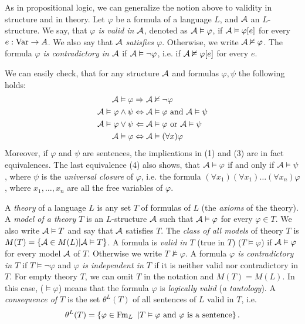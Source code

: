 As in propositional logic, we can generalize the notion above to validity in structure and in theory. Let $\varphi$ be a formula of a language $L$, and $\mathcal{A}$ an $L$-structure. We say, that \emph{$\varphi$ is valid in $\mathcal{A}$}, denoted as $\mathcal{A} \vDash \varphi$, if $\mathcal{A} \vDash \varphi[e]$ for every $e: \operatorname{Var} \to A$. We also say that \emph{$\mathcal{A}$ satisfies $\varphi$}. Otherwise, we write $\mathcal{A} \nvDash \varphi$. The formula \emph{$\varphi$ is contradictory in $\mathcal{A}$} if $\mathcal{A} \vDash \neg \varphi$, i.e. if $\mathcal{A} \nvDash \varphi[e]$ for every $e$.

We can easily check, that for any structure $\mathcal{A}$ and formulas $\varphi, \psi$ the following holds:
\begin{align}
	\mathcal{A} \vDash \varphi & \Rightarrow \mathcal{A} \nvDash \neg \varphi \\
	\mathcal{A} \vDash \varphi \land \psi & \Leftrightarrow \mathcal{A} \vDash \varphi \text{ and } \mathcal{A} \vDash \psi\\
	\mathcal{A} \vDash \varphi \lor \psi & \Leftarrow \mathcal{A} \vDash \varphi \text{ or } \mathcal{A} \vDash \psi\\
	\mathcal{A} \vDash \varphi & \Leftrightarrow \mathcal{A} \vDash (\forall x)\varphi
\end{align}
Moreover, if $\varphi$ and $\psi$ are sentences, the implications in (1) and (3) are in fact equivalences. The last equivalence (4) also shows, that $\mathcal{A} \vDash \varphi$ if and only if $\mathcal{A} \vDash \psi$, where $\psi$ is the \emph{universal closure} of $\varphi$, i.e. the formula $(\forall x_1)(\forall x_1) \dots (\forall x_n)\varphi$, where $x_1, \dots, x_n$ are all the free variables of $\varphi$.

A \emph{theory} of a language $L$ is any set $T$ of formulas of $L$ (the \emph{axioms} of the theory). A \emph{model of a theory $T$} is an $L$-structure $\mathcal{A}$ such that $\mathcal{A} \vDash \varphi$ for every $\varphi \in T$. We also write $\mathcal{A} \vDash T$ and say that $\mathcal{A}$ satisfies $T$. The \emph{class of all models} of theory $T$ is $M(T) = \{\mathcal{A} \in M(L) | \mathcal{A} \vDash T\}$. A formula is \emph{valid in $T$} (true in $T$) ($T\vDash \varphi$) if $\mathcal{A} \vDash \varphi$ for every model $\mathcal{A}$ of $T$. Otherwise we write $T \nvDash \varphi$. A formula \emph{$\varphi$ is contradictory in $T$} if $T \vDash \neg \varphi$ and \emph{$\varphi$ is independent in $T$} if it is neither valid nor contradictory in $T$. For empty theory $T$, we can omit $T$ in the notation and $M(T)=M(L)$. In this case, ($\vDash \varphi$) means that the formula $\varphi$ is \emph{logically valid} (\emph{a tautology}). A \emph{consequence of $T$} is the set $\theta^L(T)$ of all sentences of $L$ valid in $T$, i.e. $$\theta^L(T) = \{\varphi \in \operatorname{Fm}_L\ | T\vDash \varphi \text{ and } \varphi \text{ is a sentence}\}\,.$$

